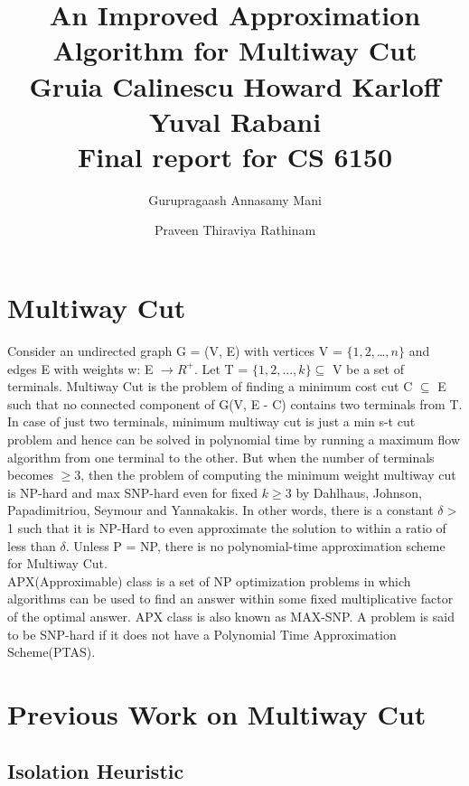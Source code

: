 \documentclass[11pt]{article}
\title{An Improved Approximation Algorithm for Multiway Cut\\Gruia Calinescu Howard Karloﬀ Yuval Rabani\\Final report for CS 6150}
\author{Gurupragaash Annasamy Mani \and Praveen Thiraviya Rathinam}
\begin{document}
\maketitle

\section{Multiway Cut}

Consider an undirected graph G = (V, E) with vertices V = $\{1, 2, $\dots$, n\}$ and edges E with weights w: E $\rightarrow R^{+}$. Let T = $\{1, 2, . . . , k\} \subseteq$ V be a set of terminals. Multiway Cut is the problem of finding a minimum cost cut C $\subseteq$ E such that no connected component of G(V, E - C) contains two terminals from T. In case of just two terminals, minimum multiway cut is just a min s-t cut problem and hence can be solved in polynomial time by running a maximum flow algorithm from one terminal to the other. But when the number of terminals becomes $\ge 3$, then the problem of computing the minimum weight multiway cut is NP-hard and max SNP-hard even for fixed $k \ge 3$ by Dahlhaus, Johnson, Papadimitriou, Seymour and Yannakakis. In other words, there is a constant $\delta >$ 1 such that it is NP-Hard to even approximate the solution to within a ratio of less than $\delta$. Unless P = NP, there is no polynomial-time approximation scheme for Multiway Cut.\\
APX(Approximable) class is a set of NP optimization problems in which algorithms can be used to find an answer within some fixed multiplicative factor of the optimal answer. APX class is also known as MAX-SNP. A problem is said to be SNP-hard if it does not have a Polynomial Time Approximation Scheme(PTAS).
 
\section{Previous Work on Multiway Cut} 
\subsection{Isolation Heuristic}
\end{document}
